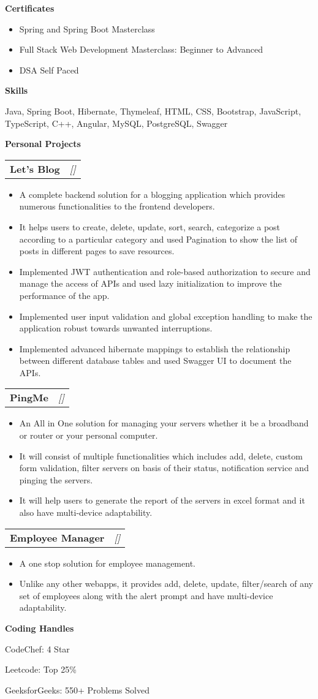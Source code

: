 \documentclass[a4paper,10pt]{article}
\makeatletter
\newcommand{\resitem}[1]{\item #1}
\newcommand{\resheading}[1]{\vspace{0.5em} {\small \colorbox{mygrey}{{\begin{minipage}{0.975\textwidth}{{\textbf{#1}}}\end{minipage}}}} \vspace{0.5em}}
\newcommand{\ressubheading}[3]{\begin{tabular*}{6.62in}{l @{\extracolsep{\fill}} r} \textbf{#1} & \textit{[#2]} \\ \end{tabular*}\vspace{-8pt}}
\makeatother
\begin{document}
\resheading{Certificates}
\begin{itemize}[noitemsep]
    \resitem{Spring and Spring Boot Masterclass}
    \resitem{Full Stack Web Development Masterclass: Beginner to Advanced}
    \resitem{DSA Self Paced}
\end{itemize}

\resheading{Skills}
\resitem{Java, Spring Boot, Hibernate, Thymeleaf, HTML, CSS, Bootstrap, JavaScript, TypeScript, C++, Angular, MySQL, PostgreSQL, Swagger}

\resheading{Personal Projects}
\ressubheading{Let's Blog}{}{}
\begin{itemize}[noitemsep]
    \resitem{A complete backend solution for a blogging application which provides numerous functionalities to the frontend developers.}
    \resitem{It helps users to create, delete, update, sort, search, categorize a post according to a particular category and used Pagination to show the list of posts in different pages to save resources.}
    \resitem{Implemented JWT authentication and role-based authorization to secure and manage the access of APIs and used lazy initialization to improve the performance of the app.}
    \resitem{Implemented user input validation and global exception handling to make the application robust towards unwanted interruptions.}
    \resitem{Implemented advanced hibernate mappings to establish the relationship between different database tables and used Swagger UI to document the APIs.}
\end{itemize}
\ressubheading{PingMe}{}{}
\begin{itemize}[noitemsep]
    \resitem{An All in One solution for managing your servers whether it be a broadband or router or your personal computer.}
    \resitem{It will consist of multiple functionalities which includes add, delete, custom form validation, filter servers on basis of their status, notification service and pinging the servers.}
    \resitem{It will help users to generate the report of the servers in excel format and it also have multi-device adaptability.}
\end{itemize}
\ressubheading{Employee Manager}{}{}
\begin{itemize}[noitemsep]
    \resitem{A one stop solution for employee management.}
    \resitem{Unlike any other webapps, it provides add, delete, update, filter/search of any set of employees along with the alert prompt and have multi-device adaptability.}
\end{itemize}

\resheading{Coding Handles}
\resitem{CodeChef: 4 Star}
\resitem{Leetcode: Top 25\%}
\resitem{GeeksforGeeks: 550+ Problems Solved}
\end{document}
